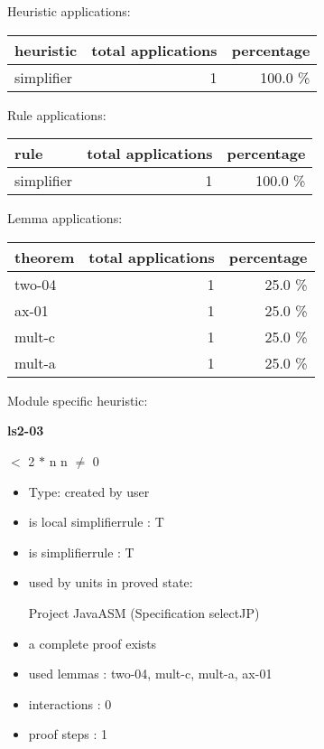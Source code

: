 \documentclass[a4paper]{article}
\begin{document}
\medskip


Heuristic applications:

\begin{supertabular}{l|r|r}
heuristic	& total applications & percentage \\ \hline
simplifier & 1 & 100.0 \% \\

\end{supertabular}

Rule applications:

\begin{supertabular}{l|r|r}
rule	        & total applications & percentage \\ \hline
simplifier & 1 & 100.0 \% \\

\end{supertabular}

Lemma applications:

\begin{supertabular}{l|r|r}
theorem	        & total applications & percentage \\ \hline
two-04 & 1 & 25.0 \% \\
ax-01 & 1 & 25.0 \% \\
mult-c & 1 & 25.0 \% \\
mult-a & 1 & 25.0 \% \\

\end{supertabular}

Module specific heuristic:

\pagebreak

{\LARGE\bf ls2-03}\label{lemma-ls2-03}

\medskip

  $<$ 2 $*$ n \Equiv n $\neq$ 0

\begin{itemize}

\item Type: created by user

\item is local simplifierrule : T
\item is simplifierrule : T
\item used by units in proved state:

Project JavaASM (Specification selectJP)
\item       a complete proof exists
\item       used lemmas  : two-04, mult-c, mult-a, ax-01
\item       interactions : 0
\item       proof steps  : 1
\end{itemize}
\end{document}
